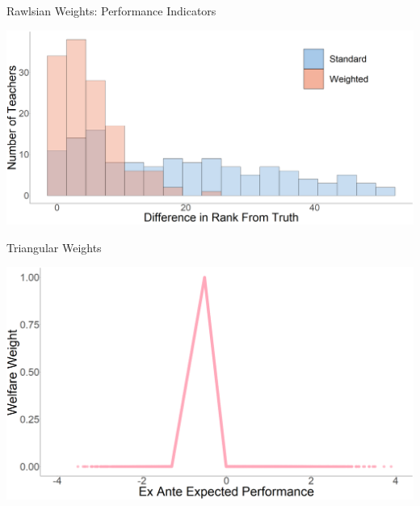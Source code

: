 \documentclass[t,aspectratio=169,11pt]{beamer}
\begin{document}

\begin{frame}{Rawlsian Weights: Performance Indicators} 

\centering

\includegraphics[width=.75\linewidth]{slides/Figures/Histrogram_rawlsian.png}

\scalebox{.8}{
    
}
\end{frame}


\begin{frame}{Triangular Weights}

\centering

\includegraphics[width=.85\linewidth]{slides/Figures/Kernal_weight.png}

\end{frame}


\end{document}
